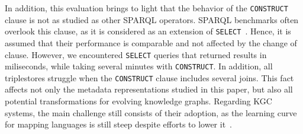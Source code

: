 In addition, this evaluation brings to light that the behavior of the \texttt{CONSTRUCT} clause is not as studied as other SPARQL operators. SPARQL benchmarks often overlook this clause, as it is considered as an extension of \texttt{SELECT}~\parencite{schmidt2009sp}. Hence, it is assumed that their performance is comparable and not affected by the change of clause. However, we encountered \texttt{SELECT} queries that returned results in miliseconds, while taking several minutes with \texttt{CONSTRUCT}. 
In addition, all triplestores struggle when the \texttt{CONSTRUCT} clause includes several joins. This fact affects not only the metadata representations studied in this paper, but also all potential transformations for evolving knowledge graphs. Regarding KGC systems, the main challenge still consists of their adoption, as the learning curve for mapping languages is still steep despite efforts to lower it~\parencite{iglesias2023yarrrml}.